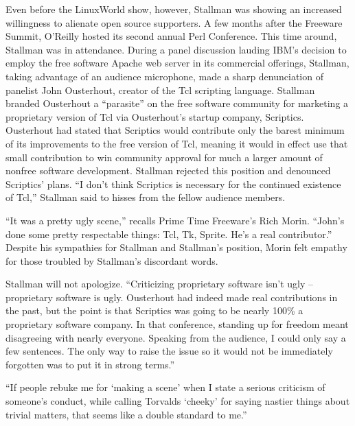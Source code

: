 \ifdefined\chs

\fi

\ifdefined\eng
Even before the LinuxWorld show, however, Stallman was showing an increased willingness to alienate open source supporters. A few months after the Freeware Summit, O'Reilly hosted its second annual Perl Conference. This time around, Stallman was in attendance. During a panel discussion lauding IBM's decision to employ the free software Apache web server in its commercial offerings, Stallman, taking advantage of an audience microphone, made a sharp denunciation of panelist John Ousterhout, creator of the Tcl scripting language. Stallman branded Ousterhout a ``parasite'' on the free software community for marketing a proprietary version of Tcl via Ousterhout's startup company, Scriptics.  Ousterhout had stated that Scriptics would contribute only the barest minimum of its improvements to the free version of Tcl, meaning it would in effect use that small contribution to win community approval for much a larger amount of nonfree software development.  Stallman rejected this position and denounced Scriptics' plans. ``I don't think Scriptics is necessary for the continued existence of Tcl,'' Stallman said to hisses from the fellow audience members.
\fi

\ifdefined\chs

\fi

\ifdefined\eng
``It was a pretty ugly scene,'' recalls Prime Time Freeware's Rich Morin. ``John's done some pretty respectable things: Tcl, Tk, Sprite. He's a real contributor.''  Despite his sympathies for Stallman and Stallman's position, Morin felt empathy for those troubled by Stallman's discordant words.
\fi

\ifdefined\chs

\fi

\ifdefined\eng
Stallman will not apologize.  ``Criticizing proprietary software isn't ugly -- proprietary software is ugly.  Ousterhout had indeed made real contributions in the past, but the point is that Scriptics was going to be nearly 100\% a proprietary software company.  In that conference, standing up for freedom meant disagreeing with nearly everyone. Speaking from the audience, I could only say a few sentences.  The only way to raise the issue so it would not be immediately forgotten was to put it in strong terms.''
\fi

\ifdefined\chs

\fi

\ifdefined\eng
``If people rebuke me for `making a scene' when I state a serious criticism of someone's conduct, while calling Torvalds `cheeky' for saying nastier things about trivial matters, that seems like a double standard to me.''
\fi


